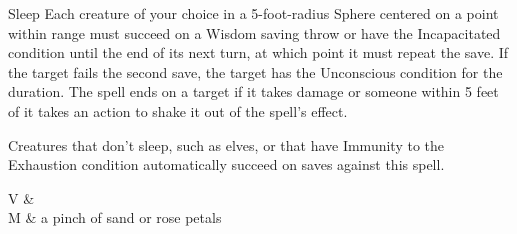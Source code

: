 \begin{Spell}[
    tags=Concentration,
    level=1st,
    time=1 Action,
    range=60 ft. (5 ft. sphere),
    components={V, S, M},
    duration=1 Minute,
    school=Enchantment,
    attack=WIS Save,
    effect=Incapacitated
]{Sleep}
Each creature of your choice in a 5-foot-radius Sphere centered on a point within range must succeed on a Wisdom saving throw or have the Incapacitated condition until the end of its next turn, at which point it must repeat the save. If the target fails the second save, the target has the Unconscious condition for the duration. The spell ends on a target if it takes damage or someone within 5 feet of it takes an action to shake it out of the spell's effect.

Creatures that don't sleep, such as elves, or that have Immunity to the Exhaustion condition automatically succeed on saves against this spell.

\begin{components}
V &   \\
M & a pinch of sand or rose petals
\end{components}
\end{Spell}


